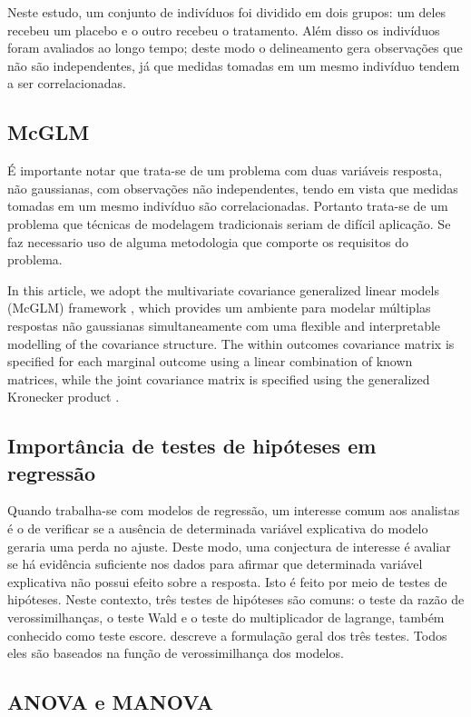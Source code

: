 \documentclass[AMA,STIX1COL]{WileyNJD-v2}
\begin{document}
Neste estudo, um conjunto de indivíduos foi dividido em dois grupos: um deles recebeu um placebo e o outro recebeu o tratamento. Além disso os indivíduos foram avaliados ao longo tempo; deste modo o delineamento gera observações que não são independentes, já que medidas tomadas em um mesmo indivíduo tendem a ser correlacionadas. 

\subsection{McGLM}

É importante notar que trata-se de um problema com duas variáveis resposta, não gaussianas, com observações não independentes, tendo em vista que medidas tomadas em um mesmo indivíduo são correlacionadas. Portanto trata-se de um problema que técnicas de modelagem tradicionais seriam de difícil aplicação. Se faz necessario uso de alguma metodologia que comporte os requisitos do problema.

In this article, we adopt the multivariate covariance generalized linear models (McGLM) framework \cite{Bonat16}, which provides um ambiente para modelar múltiplas respostas não gaussianas simultaneamente com uma flexible and interpretable modelling of the covariance structure. The within outcomes covariance matrix is specified for each marginal outcome using a linear combination of known matrices, while the joint covariance matrix is specified using the generalized Kronecker product \cite{martinez13,Bonat16}.

\subsection{Importância de testes de hipóteses em regressão}

Quando trabalha-se com modelos de regressão, um interesse comum aos analistas é o de verificar se a ausência de determinada variável explicativa do modelo geraria uma perda no ajuste. Deste modo, uma conjectura de interesse é avaliar se há evidência suficiente nos dados para afirmar que determinada variável explicativa não possui efeito sobre a resposta. Isto é feito por meio de testes de hipóteses. Neste contexto, três testes de hipóteses são comuns: o teste da razão de verossimilhanças, o teste Wald e o teste do multiplicador de lagrange, também conhecido como teste escore. \cite{engle} descreve a formulação geral dos três testes. Todos eles são baseados na função de verossimilhança dos modelos. 

\subsection{ANOVA e MANOVA}
\end{document}
